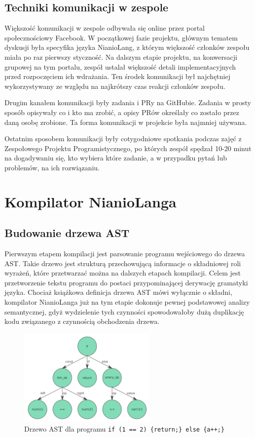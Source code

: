 \documentclass[licencjacka]{pracamgr}
\begin{document}
\section{Techniki komunikacji w zespole}
Większość komunikacji w zespole odbywała się online przez portal społecznościowy Facebook.
W początkowej fazie projektu, głównym tematem dyskusji była specyfika języka NianioLang,
z którym większość członków zespołu miała po raz pierwszy styczność.
Na dalszym etapie projektu, na konwersacji grupowej na tym portalu, zespół
ustalał większość detali implementacyjnych przed rozpoczęciem ich wdrażania.
Ten środek komunikacji był najchętniej wykorzystywany ze względu na najkrótszy czas
reakcji członków zespołu.

Drugim kanałem komunikacji były zadania i PRy na GitHubie. Zadania w prosty sposób
opisywały co i kto ma zrobić, a opisy PRów określały co zostało przez daną osobę zrobione.
Ta forma komunikacji w projekcie była najmniej używana.

Ostatnim sposobem komunikacji były cotygodniowe spotkania podczas zajęć z Zespołowego
Projektu Programistycznego, po których zespół spędzał 10-20 minut na dogadywaniu się,
kto wybiera które zadanie, a w przypadku pytań lub problemów, na ich rozwiązaniu.

\chapter{Kompilator NianioLanga}
\label{sec:compiler}
\section{Budowanie drzewa AST}
Pierwszym etapem kompilacji jest parsowanie programu wejściowego do drzewa AST. Takie drzewo jest strukturą przechowującą informacje o składniowej roli wyrażeń, które przetwarzać można na dalszych etapach kompilacji. Celem jest przetworzenie tekstu programu do postaci przypominającej derywację gramatyki języka. Chociaż książkowa definicja drzewa AST mówi wyłącznie o składni, kompilator NianioLanga już na tym etapie dokonuje pewnej podstawowej analizy semantycznej, gdyż wydzielenie tych czynności spowodowałoby dużą duplikację kodu związanego z czynnością obchodzenia drzewa.

\begin{figure}[h]
  \centering
  \includegraphics[width=0.6\textwidth]{files/ast.png}
  \caption{Drzewo AST dla programu \texttt{if (1 == 2) \{return;\} else \{a++;\}}}
  \label{img:ast}
\end{figure}
\end{document}
